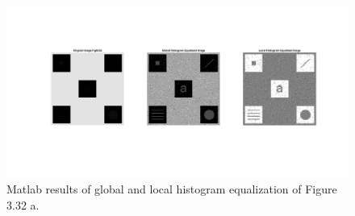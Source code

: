 \documentclass[./rarnold_report2.tex]{subfiles}
\begin{document}
\begin{enumerate}[a.]
	\begin{figure}[!htbp]
	\centering
	\includegraphics[scale=0.28]{"local_histeq"}
	\caption{Matlab results of global and local histogram equalization of Figure 3.32 a.} 
	\label{local}
	\end{figure}

\end{enumerate}
\end{document}
